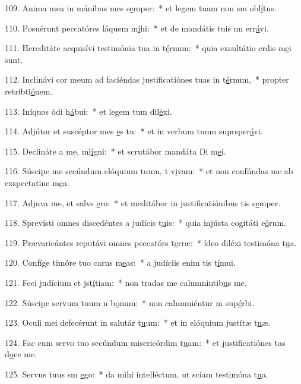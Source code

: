 109. Anima mea in mánibus mes s\uline{e}mper:~* et legem tuam non sm obl\uline{í}tus.\par 
110. Posuérunt peccatóres láquem m\uline{i}hi:~* et de mandátis tuis nn err\uline{á}vi.\par 
111. Hereditáte acquisívi testimónia tua in t\uline{é}rnum:~* quia exsultátio crdis m\uline{e}i sunt.\par 
112. Inclinávi cor meum ad faciéndas justificatiónes tuas in t\uline{é}rnum,~* propter retribti\uline{ó}nem.\par 
113. Iníquos ódi h\uline{á}bui:~* et legem tum dil\uline{é}xi.\par 
114. Adjútor et suscéptor mes \uline{e}s tu:~* et in verbum tuum suprsper\uline{á}vi.\par 
115. Declináte a me, ml\uline{í}gni:~* et scrutábor mandáta Di m\uline{e}i.\par 
116. Súscipe me secúndum elóquium tuum, t v\uline{i}vam:~* et non confúndas me ab exspectatine m\uline{e}a.\par 
117. Adjuva me, et salvs \uline{e}ro:~* et meditábor in justificatiónibus tis s\uline{e}mper.\par 
118. Sprevísti omnes discedéntes a judícis t\uline{u}is:~* quia injústa cogitáti e\uline{ó}rum.\par 
119. Prævaricántes reputávi omnes peccatórs t\uline{e}rræ:~* ídeo diléxi testimóna t\uline{u}a.\par 
120. Confíge timóre tuo carns m\uline{e}as:~* a judíciis enim tis t\uline{í}mui.\par 
121. Feci judícium et jst\uline{í}tiam:~* non tradas me calumnintib\uline{u}s me.\par 
122. Súscipe servum tuum n b\uline{o}num:~* non calumniéntur m sup\uline{é}rbi.\par 
123. Oculi mei defecérunt in salutár t\uline{u}um:~* et in elóquium justítæ t\uline{u}æ.\par 
124. Fac cum servo tuo secúndum misericórdim t\uline{u}am:~* et justificatiónes tas d\uline{o}ce me.\par 
125. Servus tuus sm \uline{e}go:~* da mihi intelléctum, ut sciam testimóna t\uline{u}a.\par 
